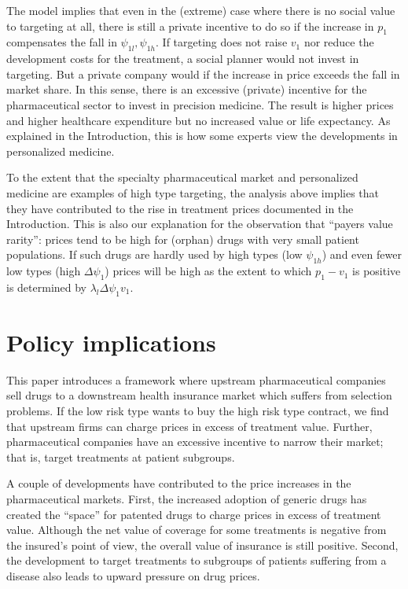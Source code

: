 \documentclass[a4paper,12pt]{article}
\begin{document}
The model implies that even in the (extreme) case where there is no social value to targeting at all, there is still a private incentive to do so if the increase in \(p_1\) compensates the fall in \(\psi_{1l},\psi_{1h}\). If targeting does not raise \(v_1\) nor reduce the development costs for the treatment, a social planner would not invest in targeting. But a private company would if the increase in price exceeds the fall in market share. In this sense, there is an excessive (private) incentive for the pharmaceutical sector to invest in precision medicine. The result is higher prices and higher healthcare expenditure but no increased value or life expectancy. As explained in the Introduction, this is how some experts view the developments in personalized medicine.

To the extent that the specialty pharmaceutical market and  personalized medicine are examples of high type targeting, the analysis above implies that they have contributed to the rise in treatment prices documented in the Introduction. This is also our explanation for the observation that ``payers value rarity'': prices tend to be high for (orphan) drugs with very small patient populations. If such drugs are hardly used by high types (low \(\psi_{1h}\)) and even fewer low types (high \(\Delta \psi_1\)) prices will be high as the extent to which \(p_1-v_1\) is positive is determined by \(\lambda_l \Delta \psi_1 v_1\).


\section{Policy implications}
\label{sec:org08a3a6a}

This paper introduces a framework where upstream pharmaceutical companies sell drugs to a downstream health insurance market which suffers from selection problems. If the low risk type wants to buy the high risk type contract, we find that upstream firms can charge prices in excess of treatment value. Further, pharmaceutical companies have an excessive incentive to narrow their market; that is, target treatments at patient subgroups.

A couple of developments have contributed to the price increases in the pharmaceutical markets. First, the increased adoption of generic drugs has created the ``space'' for patented drugs to charge prices in excess of treatment value. Although the net value of coverage for some treatments is negative from the insured's point of view, the overall value of insurance is still positive. Second, the development to target treatments to subgroups of patients suffering from a disease also leads to upward pressure on drug prices. 
\end{document}
